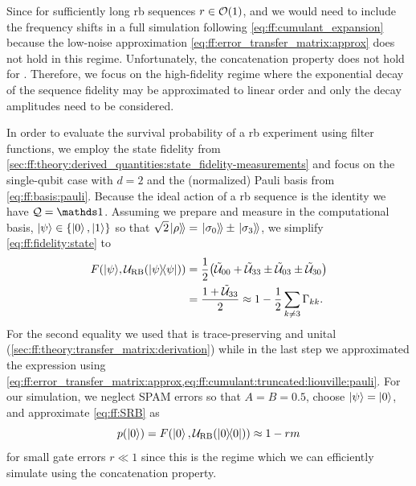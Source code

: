 Since for sufficiently long \gls{rb} sequences $r\in\order{1}$, and we would need to include the frequency shifts \freqshifts in a full simulation following \cref{eq:ff:cumulant_expansion} because the low-noise approximation \cref{eq:ff:error_transfer_matrix:approx} does not hold in this regime.
Unfortunately, the concatenation property does not hold for \freqshifts.
Therefore, we focus on the high-fidelity regime where the exponential decay of the sequence fidelity may be approximated to linear order and only the decay amplitudes \decayamps need to be considered.

In order to evaluate the survival probability of a \gls{rb} experiment using filter functions, we employ the state fidelity from \cref{sec:ff:theory:derived_quantities:state_fidelity-measurements} and focus on the single-qubit case with $d = 2$ and the (normalized) Pauli basis from \cref{eq:ff:basis:pauli}.
Because the ideal action of a \gls{rb} sequence is the identity we have $\liouvQ = \eye$.
Assuming we prepare and measure in the computational basis, $\mbox{\ensuremath{\ket{\psi}}}\in\lbrace\ket{0}, \ket{1}\rbrace$ so that $\sqrt{2}\mbox{\ensuremath{\left.\ket{\rho}\!\right\rangle}} = \mbox{\ensuremath{\left.\ket{\sigma_0}\!\right\rangle}}\pm\mbox{\ensuremath{\left.\ket{\sigma_3}\!\right\rangle}}$, we simplify \cref{eq:ff:fidelity:state} to
\begin{equation}\label{eq:ff:fidelity:state:RB}
    \begin{split}
        F(\mbox{\ensuremath{\ket{\psi}}}, \mathcal{U}_{\mathrm{RB}}(\op{\psi})) &= \frac{1}{2}\bigl(\mathcal{\tilde{U}}_{00} +
                                                                \mathcal{\tilde{U}}_{33}\pm
                                                                \mathcal{\tilde{U}}_{03}\pm
                                                                \mathcal{\tilde{U}}_{30}\bigr) \\
                                                &= \frac{1 + \mathcal{\tilde{U}}_{33}}{2} \approx 1 - \frac{1}{2}\sum_{k\neq 3}\Gamma_{kk}.
    \end{split}
\end{equation}
For the second equality we used that \liouvUe is trace-preserving and unital (\cf \cref{sec:ff:theory:transfer_matrix:derivation}) while in the last step we approximated the expression using \cref{eq:ff:error_transfer_matrix:approx,eq:ff:cumulant:truncated:liouville:pauli}.
For our simulation, we neglect SPAM errors so that $A =  B =  0.5$, choose $\mbox{\ensuremath{\ket{\psi}}} = \ket{0}$, and approximate \cref{eq:ff:SRB} as
\begin{equation}\label{eq:ff:fidelity:state:RB:fit}
    p(\ket{0}) = F(\ket{0}, \mathcal{U}_{\mathrm{RB}}(\op{0}))\approx 1 - rm
\end{equation}
for small gate errors $r\ll 1$ since this is the regime which we can efficiently simulate using the concatenation property.

